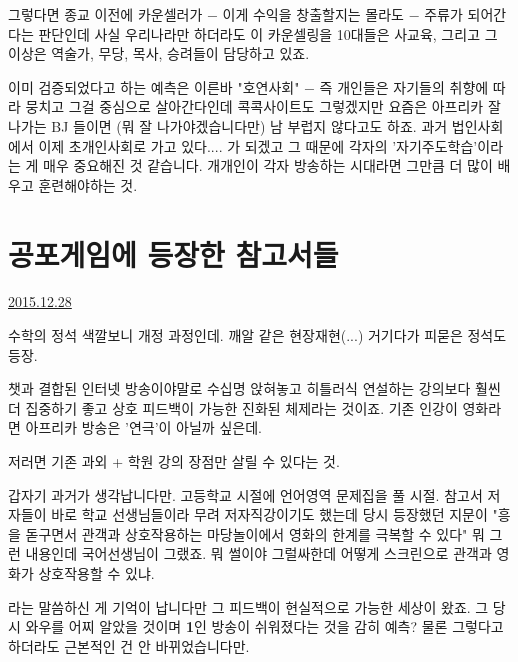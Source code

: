 \begin{enumerate}
    그렇다면 종교 이전에 카운셀러가 $-$ 이게 수익을 창출할지는 몰라도 $-$ 주류가 되어간다는 판단인데
    사실 우리나라만 하더라도 이 카운셀링을 10대들은 사교육, 그리고 그 이상은 역술가, 무당, 목사, 승려들이 담당하고 있죠.
    \vspace{5mm}

    이미 검증되었다고 하는 예측은 이른바 "호연사회" $-$ 즉 개인들은 자기들의 취향에 따라 뭉치고 그걸 중심으로 살아간다인데
    콕콕사이트도 그렇겠지만 요즘은 아프리카 잘 나가는 BJ 들이면 (뭐 잘 나가야겠습니다만) 남 부럽지 않다고도 하죠.
    과거 법인사회에서 이제 초개인사회로 가고 있다.... 가 되겠고 그 때문에 각자의 '자기주도학습'이라는 게 매우 중요해진 것 같습니다.
    개개인이 각자 방송하는 시대라면 그만큼 더 많이 배우고 훈련해야하는 것.
\vspace{5mm}
\end{enumerate}







\section{공포게임에 등장한 참고서들}
\href{https://www.kockoc.com/Apoc/567960}{2015.12.28}

\vspace{5mm}

수학의 정석 색깔보니 개정 과정인데.
깨알 같은 현장재현(...)
거기다가 피묻은 정석도 등장.
\vspace{5mm}

챗과 결합된 인터넷 방송이야말로 수십명 앉혀놓고 히틀러식 연설하는 강의보다
훨씬 더 집중하기 좋고 상호 피드백이 가능한 진화된 체제라는 것이죠.
기존 인강이 영화라면 아프리카 방송은 '연극'이 아닐까 싶은데.
\vspace{5mm}

저러면 기존 과외 + 학원 강의 장점만 살릴 수 있다는 것.
\vspace{5mm}

갑자기 과거가 생각납니다만.
고등학교 시절에 언어영역 문제집을 풀 시절. 참고서 저자들이 바로 학교 선생님들이라 무려 저자직강이기도 했는데
당시 등장했던 지문이 "흥을 돋구면서 관객과 상호작용하는 마당놀이에서 영화의 한계를 극복할 수 있다" 뭐 그런 내용인데
국어선생님이 그랬죠. 뭐 썰이야 그럴싸한데 어떻게 스크린으로 관객과 영화가 상호작용할 수 있냐.
\vspace{5mm}

라는 말씀하신 게 기억이 납니다만 그 피드백이 현실적으로 가능한 세상이 왔죠.
그 당시 와우를 어찌 알았을 것이며 \textbf{1}인 방송이 쉬워졌다는 것을 감히 예측?
물론 그렇다고 하더라도 근본적인 건 안 바뀌었습니다만.

